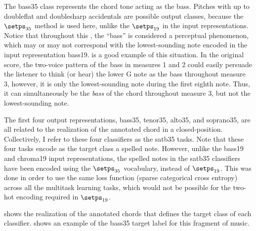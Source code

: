 
The \gls{bass35} class represents the chord tone acting as
the bass. Pitches with up to \gls{doubleflat} and
\gls{doublesharp} accidentals are possible output classes,
because the $\setps_{35}$ method is used here, unlike the
$\setps_{19}$ in the input representations. Notice that
throughout this \thesisdiss{}, the ``bass'' is considered a
perceptual phenomenon, which may or may not correspond with
the lowest-sounding note encoded in the input representation
\gls{bass19}.  is a good example of
this situation. In the original score, the two-voice pattern
of the bass in measures 1 and 2 could easily persuade the
listener to think (or hear) the lower G note as the bass
throughout measure 3, however, it is only the
lowest-sounding note during the first eighth note. Thus, it
can simultaneously be the \emph{bass} of the chord
throughout measure 3, but not the lowest-sounding note.

The first four output representations, \gls{bass35},
\gls{tenor35}, \gls{alto35}, and \gls{soprano35}, are all
related to the realization of the annotated chord in a
\gls{closed-position}. Collectively, I refer to these four
classifiers as the \gls{satb35} tasks. Note that these four
tasks encode as the target class a spelled note. However,
unlike the \gls{bass19} and \gls{chroma19} input
representations, the spelled notes in the \gls{satb35}
classifiers have been encoded using the $\setps_{35}$
vocabulary, instead of $\setps_{19}$. This was done in order
to use the same loss function (sparse categorical cross
entropy) across all the multitask learning tasks, which
would not be possible for the two-hot encoding required in
$\setps_{19}$.

 shows the realization of the annotated
chords that defines the target class of each classifier.
 shows an example of the \gls{bass35}
target label for this fragment of music.





